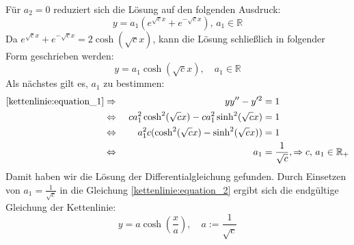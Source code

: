 Für \(a_2 = 0\) reduziert sich die Lösung auf den folgenden Ausdruck:
\[
	y
	=
	a_1\left(e^{\sqrt{c}x} + e^{-\sqrt{c}x}\right), \, a_1 \in \mathbb{R}
\]
Da \(e^{\sqrt{c}x} + e^{-\sqrt{c}x} = 2\cosh(\sqrt{c}x)\), kann die Lösung schließlich in folgender Form geschrieben werden:
\begin{equation}
	y
	=
	a_1\cosh(\sqrt{c}x), \quad a_1 \in \mathbb{R}
	\label{kettenlinie:equation_2}
\end{equation}
Als nächstes gilt es, \(a_1\) zu bestimmen:
\begin{align*}
	\eqref{kettenlinie:equation_1}
	&\Rightarrow &\
	yy'' - y'^2
	&=
	1
	\\
	&\Leftrightarrow &\
	ca_1^2\cosh^2(\sqrt{c}x) - ca_1^2\sinh^2(\sqrt{c}x)
	&=
	1
	\\
	&\Leftrightarrow &\
	a_1^2c(\cosh^2(\sqrt{c}x) - \sinh^2(\sqrt{c}x))
	&=
	1
	\\
	&\Leftrightarrow &\
	a_1
	&=
	\frac{1}{\sqrt{c}}, \Rightarrow c, \, a_1 \in \mathbb{R}_+
\end{align*}
Damit haben wir die Lösung der Differentialgleichung gefunden. Durch Einsetzen von \(a_1 = \frac{1}{\sqrt{c}}\) in die Gleichung \eqref{kettenlinie:equation_2} ergibt sich die endgültige Gleichung der Kettenlinie:
\[
y = a \cosh\left(\frac{x}{a}\right), \quad a := \frac{1}{\sqrt{c}}
\]
